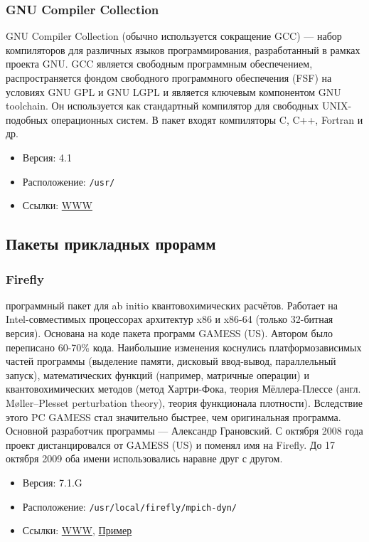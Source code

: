\documentclass[a4paper,8pt]{extreport}
\newcounter{ex}
\begin{document}
\subsubsection{GNU Compiler Collection}
GNU Compiler Collection (обычно используется сокращение GCC) — набор компиляторов для различных языков 
программирования, разработанный в рамках проекта GNU. GCC является свободным программным обеспечением, 
распространяется фондом свободного программного обеспечения (FSF) на условиях GNU GPL и GNU LGPL и является 
ключевым компонентом GNU toolchain. Он используется как стандартный компилятор для свободных UNIX-подобных 
операционных систем.
В пакет входят компиляторы C, C++, Fortran и др.
\begin{itemize}
 \item Версия: 4.1
 \item Расположение: \verb|/usr/|
 \item Ссылки: \href{http://gcc.gnu.org/}{WWW}
\end{itemize}

\subsection{Пакеты прикладных прорамм}
\subsubsection{Firefly}
программный пакет для ab initio квантовохимических расчётов. Работает на Intel-совместимых процессорах 
архитектур x86 и x86-64 (только 32-битная версия). Основана на коде пакета программ GAMESS (US). Автором 
было переписано 60-70\% кода. Наибольшие изменения коснулись платформозависимых частей программы 
(выделение памяти, дисковый ввод-вывод, параллельный запуск), математических функций (например, 
матричные операции) и квантовохимических методов (метод Хартри-Фока, теория Мёллера-Плессе 
(англ. Møller–Plesset perturbation theory), теория функционала плотности). Вследствие этого PC GAMESS 
стал значительно быстрее, чем оригинальная программа. Основной разработчик программы — Александр Грановский.
С октября 2008 года проект дистанцировался от GAMESS (US) и поменял имя на Firefly. До 17 октября 2009 оба
имени использовались наравне друг с другом.
\begin{itemize}
 \item Версия: 7.1.G
 \item Расположение: \verb|/usr/local/firefly/mpich-dyn/|
 \item Ссылки: \href{http://classic.chem.msu.su/gran/gamess/}{WWW}, \hyperlink{Firefly_ex}{Пример}
\end{itemize}
\end{document}
